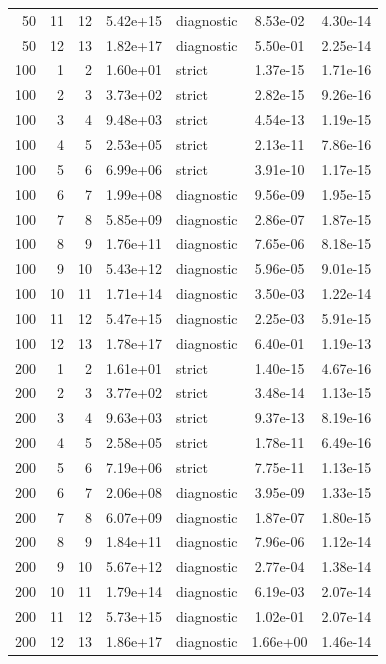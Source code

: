 \begin{longtable}{r r r S[table-format=1.2e-2] l S[table-format=1.2e-2] S[table-format=1.2e-2]}
50 & 11 & 12 & 5.42e+15 & diagnostic & 8.53e-02 & 4.30e-14 \\
50 & 12 & 13 & 1.82e+17 & diagnostic & 5.50e-01 & 2.25e-14 \\
100 & 1 & 2 & 1.60e+01 & strict & 1.37e-15 & 1.71e-16 \\
100 & 2 & 3 & 3.73e+02 & strict & 2.82e-15 & 9.26e-16 \\
100 & 3 & 4 & 9.48e+03 & strict & 4.54e-13 & 1.19e-15 \\
100 & 4 & 5 & 2.53e+05 & strict & 2.13e-11 & 7.86e-16 \\
100 & 5 & 6 & 6.99e+06 & strict & 3.91e-10 & 1.17e-15 \\
100 & 6 & 7 & 1.99e+08 & diagnostic & 9.56e-09 & 1.95e-15 \\
100 & 7 & 8 & 5.85e+09 & diagnostic & 2.86e-07 & 1.87e-15 \\
100 & 8 & 9 & 1.76e+11 & diagnostic & 7.65e-06 & 8.18e-15 \\
100 & 9 & 10 & 5.43e+12 & diagnostic & 5.96e-05 & 9.01e-15 \\
100 & 10 & 11 & 1.71e+14 & diagnostic & 3.50e-03 & 1.22e-14 \\
100 & 11 & 12 & 5.47e+15 & diagnostic & 2.25e-03 & 5.91e-15 \\
100 & 12 & 13 & 1.78e+17 & diagnostic & 6.40e-01 & 1.19e-13 \\
200 & 1 & 2 & 1.61e+01 & strict & 1.40e-15 & 4.67e-16 \\
200 & 2 & 3 & 3.77e+02 & strict & 3.48e-14 & 1.13e-15 \\
200 & 3 & 4 & 9.63e+03 & strict & 9.37e-13 & 8.19e-16 \\
200 & 4 & 5 & 2.58e+05 & strict & 1.78e-11 & 6.49e-16 \\
200 & 5 & 6 & 7.19e+06 & strict & 7.75e-11 & 1.13e-15 \\
200 & 6 & 7 & 2.06e+08 & diagnostic & 3.95e-09 & 1.33e-15 \\
200 & 7 & 8 & 6.07e+09 & diagnostic & 1.87e-07 & 1.80e-15 \\
200 & 8 & 9 & 1.84e+11 & diagnostic & 7.96e-06 & 1.12e-14 \\
200 & 9 & 10 & 5.67e+12 & diagnostic & 2.77e-04 & 1.38e-14 \\
200 & 10 & 11 & 1.79e+14 & diagnostic & 6.19e-03 & 2.07e-14 \\
200 & 11 & 12 & 5.73e+15 & diagnostic & 1.02e-01 & 2.07e-14 \\
200 & 12 & 13 & 1.86e+17 & diagnostic & 1.66e+00 & 1.46e-14 \\
\end{longtable}
